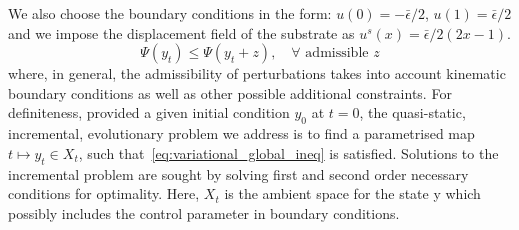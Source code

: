 We also choose the boundary conditions in the form: $u(0)=-\bar\epsilon/2$, $u(1)=\bar\epsilon/2$ and we impose the displacement field  of the substrate   as $u^s(x)=\bar \epsilon/2 (2x-1)$.
\begin{equation}
    \label{eq:variational_global_ineq}
    \Psi(y_t) \leq \Psi(y_t + z),\quad \forall \text{ admissible } z
\end{equation}
% 
where, in general, the admissibility of perturbations takes into account kinematic boundary conditions as well as other possible additional constraints.
For definiteness, provided a given initial condition $y_0$ at $t=0$, the quasi-static, incremental, evolutionary problem we address is to find a parametrised map $t \mapsto y_t \in X_t$, such that~\eqref{eq:variational_global_ineq} is satisfied. 
Solutions to the incremental problem are sought by solving first and second order necessary conditions for optimality.
Here, $X_t$ is the ambient space for the state y which possibly includes the control parameter in boundary conditions.

